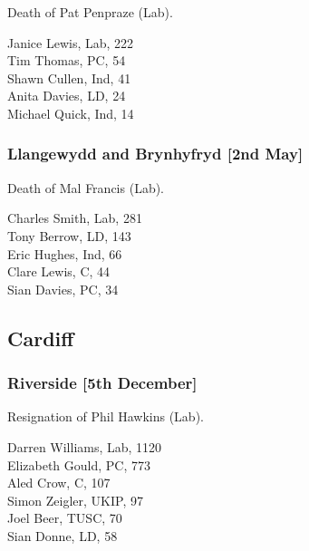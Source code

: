 \documentclass[a4paper,openany,10pt]{book}
\begin{document}

Death of Pat Penpraze (Lab).



Janice Lewis, Lab, 222\\
Tim Thomas, PC, 54\\
Shawn Cullen, Ind, 41\\
Anita Davies, LD, 24\\
Michael Quick, Ind, 14\\


\subsubsection*{Llangewydd and Brynhyfryd \hspace*{\fill}\nolinebreak[1]%
\enspace\hspace*{\fill}
[2nd May]}


Death of Mal Francis (Lab).



Charles Smith, Lab, 281\\
Tony Berrow, LD, 143\\
Eric Hughes, Ind, 66\\
Clare Lewis, C, 44\\
Sian Davies, PC, 34\\


\subsection*{Cardiff}

\subsubsection*{Riverside \hspace*{\fill}\nolinebreak[1]%
\enspace\hspace*{\fill}
[5th December]}


Resignation of Phil Hawkins (Lab).



Darren Williams, Lab, 1120\\
Elizabeth Gould, PC, 773\\
Aled Crow, C, 107\\
Simon Zeigler, UKIP, 97\\
Joel Beer, TUSC, 70\\
Sian Donne, LD, 58\\
\end{document}
